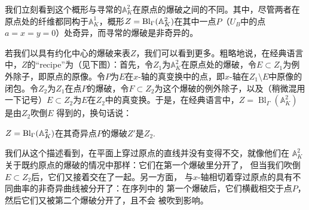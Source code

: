 我们立刻看到这个概形与寻常的$\mathbb A_K^2$在原点的爆破之间的不同。其中，尽管两者在原点处的纤维都同构于$\mathbb A_K^1$，概形$Z=\operatorname{Bl}_\Gamma(\mathbb{A}_K^2)$在其中一点$P$（$U_B$中的点$a=x=y=0$）处奇异，而寻常的爆破是非奇异的。


若我们以具有约化中心的爆破来表$Z$，我们可以看到更多。粗略地说，在经典语言中，$Z$的“recipe”\nottran 为（见下图）：首先，令$Z_1$为$\mathbb A_K^2$在原点处的爆破，令$E\subset Z_1$为例外除子，即原点的原像。令$P$为$E$在$x$-轴的真变换中的点，即$x$-轴在$Z_1\setminus E$中原像的闭包。令$Z_2$为$Z_1$在点$P$的爆破，令$F\subset Z_2$为这个爆破的例外除子，以及（稍微混用一下记号）$E\subset Z_2$为$E$在$Z_2$中的真变换。于是，在经典语言中，$Z=\operatorname{Bl}_\Gamma (\mathbb A_K^2)$是由$Z_2$吹倒$E$ 得到的，换句话说：

\begin{pro}\label{pro:4.40}
	$Z=\operatorname{Bl}_\Gamma(\mathbb A_K^2)$在其奇异点$P$的爆破$Z'$是$Z_2$.
\end{pro}



我们从这个描述看到，在平面上穿过原点的直线并没有变得不交，就像他们在
$\mathbb A_K^2$关于既约原点的爆破的情况中那样：它们在第一个爆破里分开了，
但当我们吹倒$E\subset Z_2$后，它们又接着交在了一起。另一方面，
与$x$-轴相切着穿过原点的具有不同曲率的非奇异曲线被分开了：在序列中的
第一个爆破后，它们横截相交于点$P$，然后它们又被第二个爆破分开了，且不会
被吹到影响。

